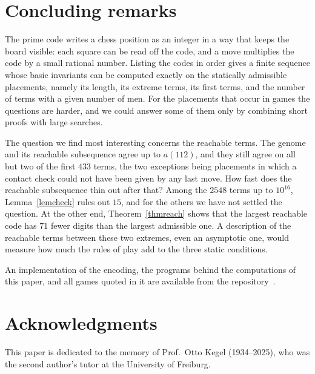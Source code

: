 \documentclass[12pt,reqno]{article}
\begin{document}
\section{Concluding remarks}\label{secopen}

The prime code writes a chess position as an integer in a way that keeps the board visible:
each square can be read off the code, and a move multiplies the code by a small rational
number. Listing the codes in order gives a finite sequence whose basic invariants can be
computed exactly on the statically admissible placements, namely its length, its extreme terms,
its first terms, and the number of terms with a given number of men. For the placements that
occur in games the questions are harder, and we could answer some of them only by combining
short proofs with large searches.

The question we find most interesting concerns the reachable terms. The genome and its
reachable subsequence agree up to $a(112)$, and they still agree on all but two of the first $433$
terms, the two exceptions being placements in which a contact check could not have been given
by any last move. How fast does the reachable subsequence thin out after that? Among the
$2548$ terms up to $10^{16}$, Lemma~\ref{lemcheck} rules out $15$, and for the others we have
not settled the question. At the other end, Theorem~\ref{thmreach} shows that the largest
reachable code has $71$ fewer digits than the largest admissible one. A description of the
reachable terms between these two extremes, even an asymptotic one, would measure how much
the rules of play add to the three static conditions.

An implementation of the encoding, the programs behind the computations of this paper, and all
games quoted in it are available from the repository~\cite{software}.

\section{Acknowledgments}

This paper is dedicated to the memory of Prof.\ Otto Kegel (1934--2025), who was the second
author's tutor at the University of Freiburg.
\end{document}
